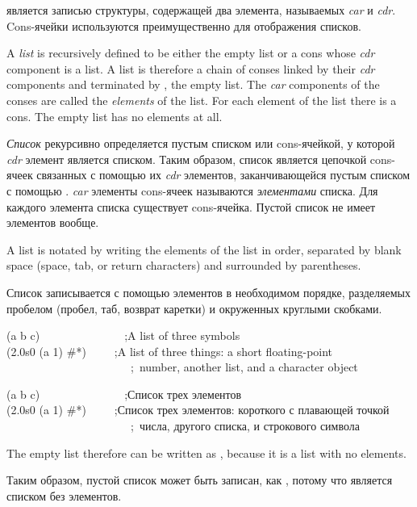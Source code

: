  является записью структуры, содержащей два элемента, называемых
\emph{car} и \emph{cdr}. Cons-ячейки используются преимущественно для отображения
списков.

A \emph{list} is recursively defined to be either the empty list
or a cons whose \emph{cdr} component is a list.
A list is therefore a chain of conses linked by their \emph{cdr} components
and terminated by {\nil}, the empty list.  The \emph{car} components of the conses
are called the \emph{elements} of the list.  For each element of the list
there is a cons.  The empty list has no elements at all.

\emph{Список} рекурсивно определяется пустым списком или cons-ячейкой, у
которой \emph{cdr} элемент является списком.
Таким образом, список является цепочкой cons-ячеек связанных с помощью их {\it
  cdr} элементов, заканчивающейся пустым списком с помощью {\nil}. \emph{car}
элементы cons-ячеек называются \emph{элементами} списка. Для каждого элемента
списка существует cons-ячейка. Пустой список не имеет элементов вообще.

A list is notated by writing the elements of the list in order,
separated by blank space (space, tab, or return characters)
and surrounded by parentheses.

Список записывается с помощью элементов в необходимом порядке, разделяемых
пробелом (пробел, таб, возврат каретки) и окруженных круглыми скобками.
\begin{lisp}
(a b c)~~~~~~~~~~~~~~~;\textrm{A list of three symbols} \\
(2.0s0 (a 1) \#{\Xbackslash}*)~~~~~;\textrm{A list of three things: a short floating-point} \\
~~~~~~~~~~~~~~~~~~~~~~;~\textrm{number, another list, and a character object}
\end{lisp}

\begin{lisp}
(a b c)~~~~~~~~~~~~~~~;\textrm{Список трех элементов} \\
(2.0s0 (a 1) \#{\Xbackslash}*)~~~~~;\textrm{Список трех элементов: короткого с
  плавающей точкой} \\
~~~~~~~~~~~~~~~~~~~~~~;~\textrm{числа, другого списка, и строкового символа}
\end{lisp}
The empty list {\nil} therefore can be written as {\emptylist}, because it is a list
with no elements.

Таким образом, пустой список {\nil} может быть записан, как {\emptylist}, потому что
является списком без элементов.

